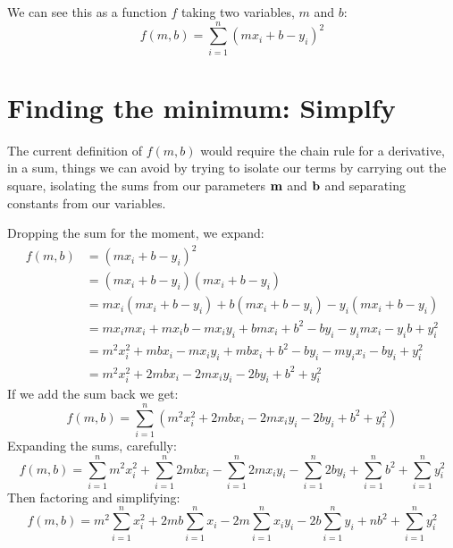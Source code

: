 \documentclass{article}
\begin{document}
We can see this as a function $f$ taking two variables, $m$ and $b$:
\begin{equation}
f(m, b) = \sum_{i=1}^{n}\left(m x_i + b - y_i\right)^2
\end{equation}


\section{Finding the minimum: Simplfy}

The current definition of $f(m, b)$ would require the chain rule for a
derivative, in a sum, things we can avoid by trying to isolate our terms
by carrying out the square, isolating the sums from our parameters ${\bf m}$
and ${\bf b}$ and separating constants from our variables.

Dropping the sum for the moment, we expand:
\begin{equation}
\begin{split}
f(m, b) & = \left(m x_i + b - y_i\right)^2\\
 & = \left(m x_i + b - y_i\right)\left(m x_i + b - y_i\right)\\
 & = m x_i \left(m x_i + b - y_i\right) + b \left(m x_i + b - y_i\right) - y_i \left(m x_i + b - y_i\right) \\
 & = m x_i m x_i + m x_i b - m x_i y_i + b m x_i + b^2 - b y_i - y_i m x_i - y_i b + y_i^2 \\
 & = m^2 x_i^2 + m b x_i  - m x_i y_i + m b x_i + b^2 - b y_i - m y_i x_i - b y_i + y_i^2 \\
 & = m^2 x_i^2 + 2 m b x_i  - 2 m x_i y_i - 2 b y_i + b^2 + y_i^2 
\end{split}
\end{equation}
If we add the sum back we get:
\begin{equation}
f(m, b) = \sum_{i=1}^n \left( m^2 x_i^2 + 2 m b x_i  - 2 m x_i y_i - 2 b y_i + b^2 + y_i^2 \right)
\end{equation}
Expanding the sums, carefully:
\begin{equation}
f(m, b) = \sum_{i=1}^n m^2 x_i^2 + \sum_{i=1}^n 2 m b x_i  - \sum_{i=1}^n 2 m x_i y_i - \sum_{i=1}^n 2 b y_i + \sum_{i=1}^n b^2 + \sum_{i=1}^n y_i^2 
\end{equation}
Then factoring and simplifying:
\begin{equation}
f(m, b) = m^2 \sum_{i=1}^n x_i^2 + 2 m b \sum_{i=1}^n  x_i  - 2 m \sum_{i=1}^n x_i y_i - 2 b \sum_{i=1}^n y_i + n b^2 + \sum_{i=1}^n y_i^2 
\end{equation}
\end{document}
